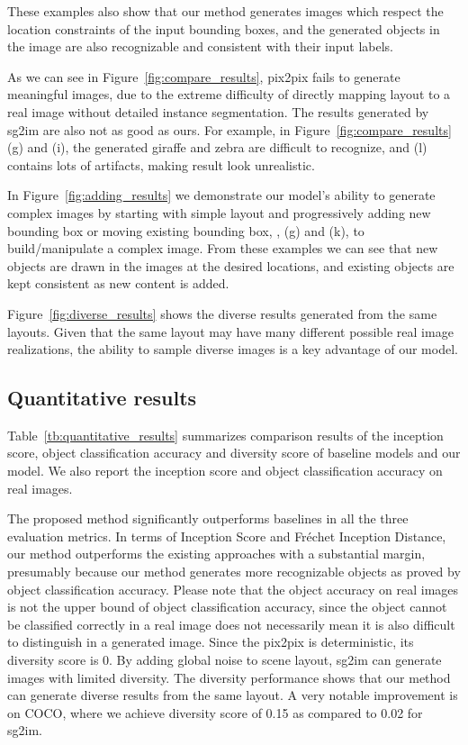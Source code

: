\documentclass[10pt,twocolumn,letterpaper]{article}
\begin{document}
These examples also show that our method generates images which respect the location constraints of the input bounding boxes, and the generated objects in the image are also recognizable and consistent with their input labels.

As we can see in Figure~\ref{fig:compare_results}, pix2pix fails to generate meaningful images, due to the extreme difficulty of directly mapping layout to a real image without detailed instance segmentation. The results generated by sg2im are also not as good as ours. For example, in Figure~\ref{fig:compare_results} (g) and (i), the generated giraffe and zebra are difficult to recognize, and (l) contains lots of artifacts, making result look unrealistic.

In Figure~\ref{fig:adding_results} we demonstrate our model's ability to generate complex images by starting with simple layout and progressively adding new bounding box or moving existing bounding box, \eg, (g) and (k), to build/manipulate a complex image. From these examples we can see that new objects are drawn in the images at the desired locations, and existing objects are kept consistent as new content is added.

Figure~\ref{fig:diverse_results} shows the diverse results generated from the same layouts. Given that the same layout may have many different possible real image realizations, the ability to sample diverse images is a key advantage of our model. 



\subsection{Quantitative results}





Table~\ref{tb:quantitative_results} summarizes comparison results of the inception score, object classification accuracy and diversity score of baseline models and our model. 
We also report the inception score and object classification accuracy on real images.

The proposed method significantly outperforms baselines in all the three evaluation metrics.
In terms of Inception Score and Fr\'echet Inception Distance, our method outperforms the existing approaches with a substantial margin, presumably because our method generates more recognizable objects as proved by object classification accuracy.
Please note that the object accuracy on real images is not the upper bound of object classification accuracy, since the object cannot be classified correctly in a real image does not necessarily mean it is also difficult to distinguish in a generated image.
Since the pix2pix is deterministic, its diversity score is 0.
By adding global noise to scene layout, sg2im can generate images with limited diversity.
The diversity performance shows that our method can generate diverse results from the same layout. A very notable improvement is on COCO, where we achieve diversity score of 0.15 as compared to 0.02 for sg2im.
\end{document}
